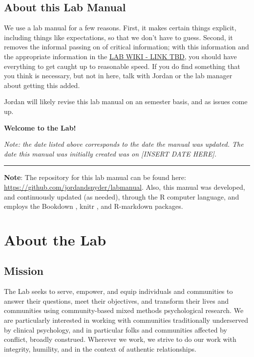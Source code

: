 \documentclass[
]{book}
\begin{document}
\hypertarget{about-this-lab-manual}{%
\section{About this Lab Manual}\label{about-this-lab-manual}}

We use a lab manual for a few reasons. First, it makes certain things explicit, including things like expectations, so that we don't have to guess. Second, it removes the informal passing on of critical information; with this information and the appropriate information in the \href{}{LAB WIKI - LINK TBD}, you should have everything to get caught up to reasonable speed. If you do find something that you think is necessary, but not in here, talk with Jordan or the lab manager about getting this added.

Jordan will likely revise this lab manual on an semester basis, and as issues come up.

\textbf{Welcome to the Lab!}

\emph{Note: the date listed above corresponds to the date the manual was updated. The date this manual was initially created was on {[}INSERT DATE HERE{]}.}

\begin{center}\rule{0.5\linewidth}{0.5pt}\end{center}

\textbf{Note}: The repository for this lab manual can be found here: \url{https://github.com/jordandsnyder/labmanual}. Also, this manual was developed, and continuously updated (as needed), through the R \citep{R-base} computer language, and employs the Bookdown \citep{R-bookdown}, knitr \citep{R-knitr}, and R-markdown \citep{R-rmarkdown} packages.

\hypertarget{about-the-lab}{%
\chapter{About the Lab}\label{about-the-lab}}

\hypertarget{mission}{%
\section{Mission}\label{mission}}

The Lab seeks to serve, empower, and equip individuals and communities to answer their questions, meet their objectives, and transform their lives and communities using community-based mixed methods psychological research. We are particularly interested in working with communities traditionally underserved by clinical psychology, and in particular folks and communities affected by conflict, broadly construed. Wherever we work, we strive to do our work with integrity, humility, and in the context of authentic relationships.
\end{document}
